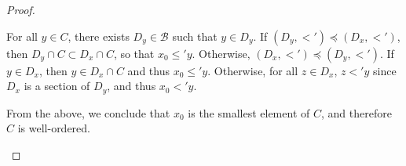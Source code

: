 \documentclass[11pt,a4paper,twoside]{article}
\theoremstyle{definition}
\theoremstyle{plain}
\begin{document}
\begin{proof}
\begin{enumerate}[(a)]
    For all $y \in C$, there exists $D_y \in \mathscr{B}$ such that $y \in D_y$.
    If $( D_y, <' ) \preceq ( D_x, <' )$, then $D_y \cap C \subset D_x \cap C$, so that $x_0 \leq' y$.
    Otherwise, $( D_x, <' ) \preceq ( D_y, <' )$. If $y \in D_x$, then $y \in D_x \cap C$ and thus
    $x_0 \leq' y$. Otherwise, for all $z \in D_x$, $z <' y$ since $D_x$ is a section of $D_y$, and
    thus $x_0 <' y$.

    From the above, we conclude that $x_0$ is the smallest element of $C$, and therefore $C$
    is well-ordered.

  \end{enumerate}

\end{proof}
\end{document}
